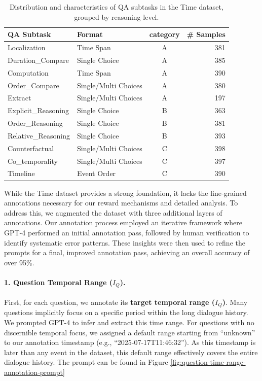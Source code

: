 \documentclass{article} %
\begin{document}
\begin{table}[htbp]
\centering
\caption{Distribution and characteristics of QA subtasks in the Time dataset, grouped by reasoning level.}
\label{tab:time_dataset_stats_detailed}
\begin{tabular}{llcr} %
\toprule
\textbf{QA Subtask} & \textbf{Format} & \textbf{category} & \textbf{\# Samples} \\
\midrule
Localization & Time Span & A & 381 \\
Duration\_Compare & Single Choice & A & 385 \\
Computation & Time Span & A & 390 \\
Order\_Compare & Single/Multi Choices & A & 380 \\
Extract & Single/Multi Choices & A & 197 \\
\midrule
Explicit\_Reasoning & Single Choice & B & 363 \\
Order\_Reasoning & Single Choice & B & 381 \\
Relative\_Reasoning & Single Choice & B & 393 \\
\midrule
Counterfactual & Single/Multi Choices& C & 398 \\
Co\_temporality & Single/Multi Choices & C & 397 \\
Timeline & Event Order & C & 390 \\
\bottomrule
\end{tabular}
\label{tab:time_dataset_stats}
\end{table}

While the Time dataset provides a strong foundation, it lacks the fine-grained annotations necessary for our reward mechanisms and detailed analysis. To address this, we augmented the dataset with three additional layers of annotations. Our annotation process employed an iterative framework where GPT-4 performed an initial annotation pass, followed by human verification to identify systematic error patterns. These insights were then used to refine the prompts for a final, improved annotation pass, achieving an overall accuracy of over 95\%.

\paragraph{1. Question Temporal Range ($I_Q$).}
First, for each question, we annotate its \textbf{target temporal range ($I_Q$)}. Many questions implicitly focus on a specific period within the long dialogue history. We prompted GPT-4 to infer and extract this time range. For questions with no discernible temporal focus, we assigned a default range starting from ``unknown'' to our annotation timestamp (e.g., ``2025-07-17T11:46:32''). As this timestamp is later than any event in the dataset, this default range effectively covers the entire dialogue history. The prompt can be found in Figure \ref{fig:question-time-range-annotation-prompt}
\end{document}
